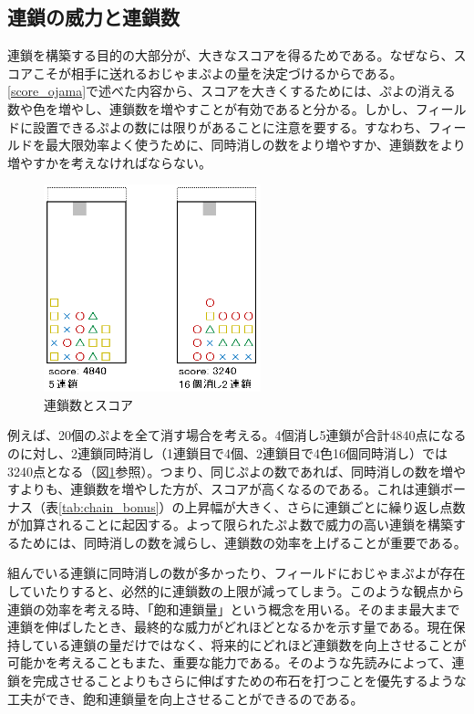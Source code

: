 \documentclass[12pt]{jsarticle}
\begin{document}
\subsection{連鎖の威力と連鎖数}
連鎖を構築する目的の大部分が、大きなスコアを得るためである。なぜなら、スコアこそが相手に送れるおじゃまぷよの量を決定づけるからである。\ref{score_ojama}で述べた内容から、スコアを大きくするためには、ぷよの消える数や色を増やし、連鎖数を増やすことが有効であると分かる。しかし、フィールドに設置できるぷよの数には限りがあることに注意を要する。すなわち、フィールドを最大限効率よく使うために、同時消しの数をより増やすか、連鎖数をより増やすかを考えなければならない。

\begin{figure}[hbt]
  \begin{center}
  \includegraphics[height=6cm]{img/chain_score.png}
  \caption{連鎖数とスコア} \label{fig:chain_score}
\end{center}
\end{figure}

例えば、20個のぷよを全て消す場合を考える。4個消し5連鎖が合計4840点になるのに対し、2連鎖同時消し（1連鎖目で4個、2連鎖目で4色16個同時消し）では3240点となる（図\ref{fig:chain_score}参照）。つまり、同じぷよの数であれば、同時消しの数を増やすよりも、連鎖数を増やした方が、スコアが高くなるのである。これは連鎖ボーナス（表\ref{tab:chain_bonus}）の上昇幅が大きく、さらに連鎖ごとに繰り返し点数が加算されることに起因する。よって限られたぷよ数で威力の高い連鎖を構築するためには、同時消しの数を減らし、連鎖数の効率を上げることが重要である。

組んでいる連鎖に同時消しの数が多かったり、フィールドにおじゃまぷよが存在していたりすると、必然的に連鎖数の上限が減ってしまう。このような観点から連鎖の効率を考える時、「飽和連鎖量」という概念を用いる。そのまま最大まで連鎖を伸ばしたとき、最終的な威力がどれほどとなるかを示す量である。現在保持している連鎖の量だけではなく、将来的にどれほど連鎖数を向上させることが可能かを考えることもまた、重要な能力である。そのような先読みによって、連鎖を完成させることよりもさらに伸ばすための布石を打つことを優先するような工夫ができ、飽和連鎖量を向上させることができるのである。
\end{document}
